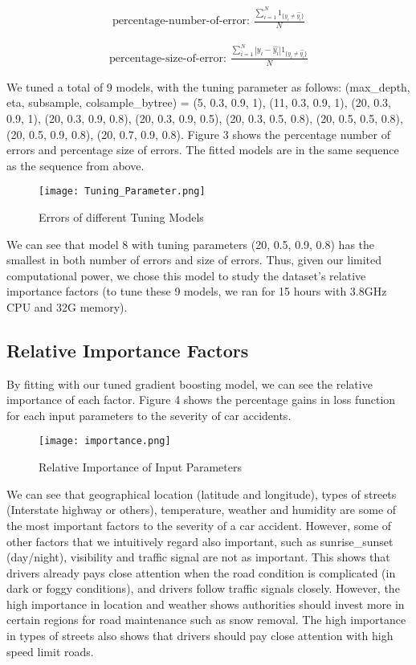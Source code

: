 \documentclass[twocolumn]{article}
\begin{document}
\begin{align}  
    \displaystyle{\text{percentage-number-of-error: }\frac{\sum_{i=1}^N 1_{\{y_i \neq \hat{y_i}\}} }{N}}
\end{align}

\begin{align}  
    \displaystyle{\text{percentage-size-of-error: }\frac{\sum_{i=1}^N |y_i-\hat{y_i}|1_{\{y_i \neq \hat{y_i}\}} }{N}}
\end{align}

We tuned a total of 9 models, with the tuning parameter as follows: (max\_depth, eta, subsample, colsample\_bytree) = (5, 0.3, 0.9, 1), (11, 0.3, 0.9, 1), (20, 0.3, 0.9, 1), (20, 0.3, 0.9, 0.8), (20, 0.3, 0.9, 0.5), (20, 0.3, 0.5, 0.8), (20, 0.5, 0.5, 0.8), (20, 0.5, 0.9, 0.8), (20, 0.7, 0.9, 0.8). Figure 3 shows the percentage number of errors and percentage size of errors. The fitted models are in the same sequence as the sequence from above. 

\begin{figure}[h]
    \centering
    \texttt{[image: Tuning\_Parameter.png]}
    \caption{Errors of different Tuning Models}
\end{figure}

We can see that model 8 with tuning parameters (20, 0.5, 0.9, 0.8) has the smallest in both number of errors and size of errors. Thus, given our limited computational power, we chose this model to study the dataset’s relative importance factors (to tune these 9 models, we ran for 15 hours with 3.8GHz CPU and 32G memory). 

\subsection{Relative Importance Factors}
By fitting with our tuned gradient boosting model, we can see the relative importance of each factor. Figure 4 shows the percentage gains in loss function for each input parameters to the severity of car accidents.

\begin{figure}[h]
    \centering
    \texttt{[image: importance.png]}
    \caption{Relative Importance of Input Parameters}
\end{figure}

We can see that geographical location (latitude and longitude), types of streets (Interstate highway or others), temperature, weather and humidity are some of the most important factors to the severity of a car accident. However, some of other factors that we intuitively regard also important, such as sunrise\_sunset (day/night), visibility and traffic signal are not as important. This shows that drivers already pays close attention when the road condition is complicated (in dark or foggy conditions), and drivers follow traffic signals closely. However, the high importance in location and weather shows authorities should invest more in certain regions for road maintenance such as snow removal. The high importance in types of streets also shows that drivers should pay close attention with high speed limit roads. 
\end{document}

